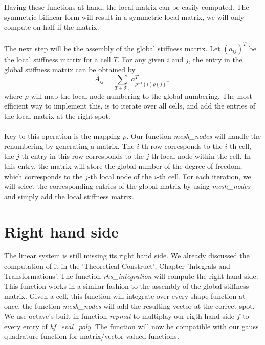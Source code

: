 Having these functions at hand, the local matrix can be easily computed. The symmetric bilinear form will result in a symmetric local matrix, we will only compute on half if the matrix.\\
\\
The next step will be the assembly of the global stiffness matrix.
Let $(a_{ij})^T$ be the local stiffness matrix for a cell $T$. For any given $i$ and $j$, the entry in the global stiffness matrix can be obtained by \[A_{ij}=\sum_{T \in \mathscr{T}_h}a_{\rho^{-1}(i)\rho(j)^{-1}}^T\] where $\rho$ will map the local node numbering to the global numbering. The most efficient way to implement this, is to iterate over all cells, and add the entries of the local matrix at the right spot.\\
\\
Key to this operation is the mapping $\rho$. Our function \textit{mesh\_nodes} will handle the renumbering by generating a matrix. The $i$-th row corresponds to the $i$-th cell, the $j$-th entry in this row corresponds to the $j$-th local node within the cell. In this entry, the matrix will store the global number of the degree of freedom, which corresponds to the $j$-th local node of the $i$-th cell. For each iteration, we will select the corresponding entries of the global matrix by using \textit{mesh\_nodes} and simply add the local stiffness matrix.

\section{Right hand side}
The linear system is still missing its right hand side. We already discussed the computation of it in the 'Theoretical Construct', Chapter 'Integrals and Transformations'. The function \textit{rhs\_integration} will compute the right hand side. \\
This function works in a similar fashion to the assembly of the global stiffness matrix. Given a cell, this function will integrate over every shape function at once, the function \textit{mesh\_nodes} will add the resulting vector at the correct spot. We use octave's built-in function \textit{repmat} to multiplay our rigth hand side $f$ to every entry of \textit{hf\_eval\_poly}. The function will now be compatible with our gauss quadrature function for matrix/vector valued functions.

